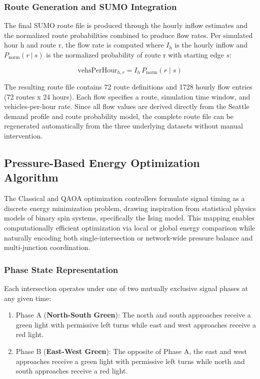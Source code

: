 \documentclass[12pt]{article}
\begin{document}
\subsubsection{Route Generation and SUMO Integration}

The final SUMO route file is produced through the hourly inflow estimates and the normalized route probabilities combined to produce flow rates. Per simulated hour h and route r, the flow rate is computed where \(I_{h}\) is the hourly inflow and \(P_{\text{norm}}(r\ |\ s)\) is the normalized probability of route r with starting edge $s$:

\begin{equation}
\label{eq:vehs_ph}
    \text{vehsPerHour}_{h,r} = I_h \, P_{\text{norm}}(r \mid s)
\end{equation}



The resulting route file contains 72 route definitions and 1728 hourly flow entries (72 routes x 24 hours). Each flow specifies a route, simulation time window, and vehicles-per-hour rate. Since all flow values are derived directly from the Seattle demand profile and route probability model, the complete route file can be regenerated automatically from the three underlying datasets without manual intervention.

\subsection{Pressure-Based Energy Optimization Algorithm}

The Classical and QAOA optimization controllers formulate signal timing as a discrete energy minimization problem, drawing inspiration from statistical physics models of binary spin systems, specifically the Ising model. This mapping enables computationally efficient optimization via local or global energy comparison while naturally encoding both single-intersection or network-wide pressure balance and multi-junction coordination.

\subsubsection{Phase State Representation}

Each intersection operates under one of two mutually exclusive signal phases at any given time:

\begin{enumerate}

\item Phase A (\textbf{North-South Green}): The north and south approaches receive a green light with permissive left turns while east and west approaches receive a red light. 

\item Phase B (\textbf{East-West Green}): The opposite of Phase A, the east and west approaches receive a green light with permissive left turns while north and south approaches receive a red light.

\end{enumerate}
\end{document}
